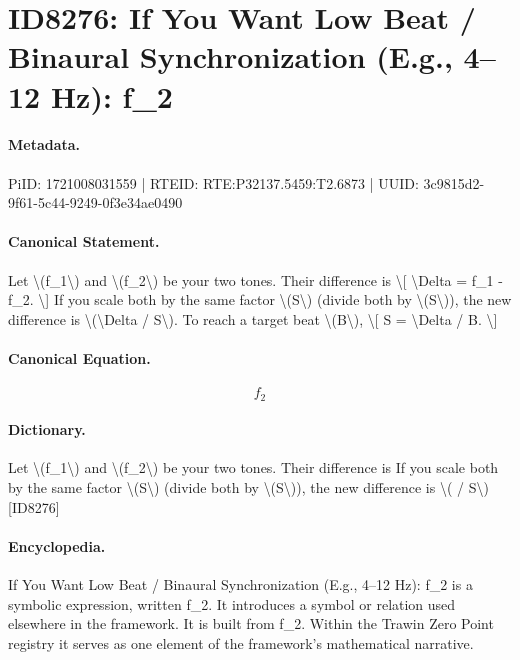 \section*{ID8276: If You Want Low Beat / Binaural Synchronization (E.g., 4–12 Hz): f\_2}
\paragraph{Metadata.}
PiID: 1721008031559 | RTEID: RTE:P32137.5459:T2.6873 | UUID: 3c9815d2-9f61-5c44-9249-0f3e34ae0490

\paragraph{Canonical Statement.}
Let \textbackslash{}(f\_1\textbackslash{}) and \textbackslash{}(f\_2\textbackslash{}) be your two tones. Their difference is \textbackslash{}[ \textbackslash{}Delta = f\_1 - f\_2. \textbackslash{}] If you scale both by the same factor \textbackslash{}(S\textbackslash{}) (divide both by \textbackslash{}(S\textbackslash{})), the new difference is \textbackslash{}(\textbackslash{}Delta / S\textbackslash{}). To reach a target beat \textbackslash{}(B\textbackslash{}), \textbackslash{}[ S = \textbackslash{}Delta / B. \textbackslash{}]

\paragraph{Canonical Equation.}
\[
f_2
\]

\paragraph{Dictionary.}
Let \textbackslash{}(f\_1\textbackslash{}) and \textbackslash{}(f\_2\textbackslash{}) be your two tones. Their difference is If you scale both by the same factor \textbackslash{}(S\textbackslash{}) (divide both by \textbackslash{}(S\textbackslash{})), the new difference is \textbackslash{}( / S\textbackslash{}) [ID8276]

\paragraph{Encyclopedia.}
If You Want Low Beat / Binaural Synchronization (E.g., 4–12 Hz): f\_2 is a symbolic expression, written f\_2. It introduces a symbol or relation used elsewhere in the framework. It is built from f\_2. Within the Trawin Zero Point registry it serves as one element of the framework's mathematical narrative.
